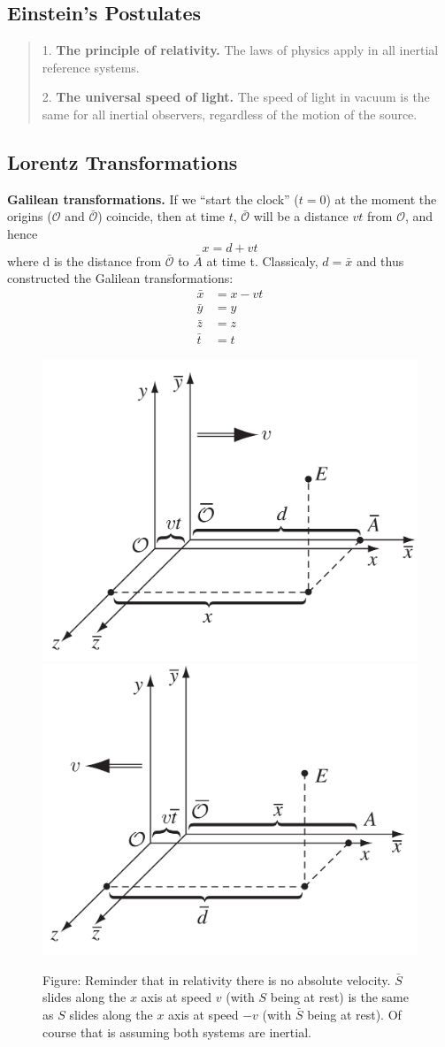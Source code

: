 \documentclass[../main.tex]{subfiles}
\begin{document}
\subsection*{Einstein's Postulates}
\begin{quote}
    1. \textbf{The principle of relativity.} The laws of physics apply in all inertial
reference systems.

    2. \textbf{The universal speed of light.} The speed of light in vacuum is the
same for all inertial observers, regardless of the motion of the source.
\end{quote}

\subsection*{Lorentz Transformations}
\textbf{Galilean transformations.} If we “start the clock” ($t = 0$) at the moment the origins ($\mathcal{O}$ and $\bar{\mathcal{O}}$) coincide, then at time $t$, $\bar{\mathcal{O}}$ will be a distance $vt$ from $\mathcal{O}$, and hence
\begin{equation*}
    x=d + vt
\end{equation*}
where d is the distance from $\bar{\mathcal{O}}$ to $\bar{A}$ at time t. Classicaly, $d=\bar{x}$ and thus constructed the Galilean transformations:
\begin{align*}
    \bar{x} &= x - vt\\
    \bar{y} &= y\\
    \bar{z} &= z\\
    \bar{t} &= t
\end{align*}
\begin{figure}[b]
    \centering
    \includegraphics[width=0.45\linewidth]{../Rss/Relativity/Transformation1.png}
    \includegraphics[width=0.45\linewidth]{../Rss/Relativity/Transformation2.png}
    \caption*{Figure: Reminder that in relativity there is no absolute velocity. $\bar{S}$ slides along the $x$ axis at speed $v$ (with $S$ being at rest) is the same as $S$ slides along the $x$ axis at speed $-v$ (with $\bar{S}$ being at rest). Of course that is assuming both systems are inertial.}
\end{figure}
\end{document}

